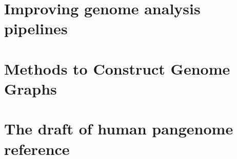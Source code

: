 \documentclass[a4paper, titlepage, openright]{book}
\begin{document}
\section{Improving genome analysis pipelines}

\section{Methods to Construct Genome Graphs}

\section{The draft of human pangenome reference}
\end{document}
